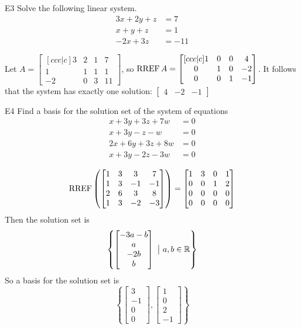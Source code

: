 \documentclass{sbgLAsemi}
\begin{document}
\begin{problem}{E3}
Solve the following linear system.
\begin{align*}
3x+2y+z &= 7 \\
x+y+z &= 1 \\
-2x+3z &= -11
\end{align*}
\end{problem}
\begin{solution}
Let \(A =
  \begin{bmatrix}[ccc|c]
    3 & 2 & 1 & 7 \\
    1 & 1 & 1 & 1 \\
    -2 & 0 & 3 & 11
  \end{bmatrix}
\), so \(\operatorname{RREF} A =
  \begin{bmatrix}[ccc|c]
    1 & 0 & 0 & 4 \\
    0 & 1 & 0 & -2 \\
    0 & 0 & 1 & -1
  \end{bmatrix}
\). It follows that the system has exactly one solution:
\(\begin{bmatrix}
  4 & -2 & -1
\end{bmatrix}\)
\end{solution}
\begin{problem}{E4}
Find a basis for the solution set of the system of equations
\begin{align*}
x+3y+3z+7w &= 0 \\
 x+3y-z-w &= 0 \\
  2x+6y+3z+8w &= 0 \\
   x+3y-2z-3w &= 0
\end{align*}
\end{problem}
\begin{solution}
$$\operatorname{RREF}\left(\begin{bmatrix} 1 & 3 & 3 & 7 \\ 1 & 3 & -1 & -1 \\ 2 & 6 & 3 & 8 \\ 1 & 3 & -2 & -3 \end{bmatrix}\right) = \begin{bmatrix} 1 & 3 & 0 & 1 \\ 0 & 0 & 1 & 2 \\ 0 & 0 & 0 & 0 \\ 0 & 0 & 0 & 0 \end{bmatrix}$$
Then the solution set is
$$\left\{ \begin{bmatrix} -3a-b \\ a \\ -2b \\ b \end{bmatrix}\ \big|\ a,b \in \mathbb{R}\right\}$$
So a basis for the solution set is $$ \left\{ \begin{bmatrix} 3 \\ -1 \\ 0 \\ 0 \end{bmatrix} , \begin{bmatrix} 1\\0 \\ 2 \\ -1 \end{bmatrix} \right\} $$
\end{solution}
\end{document}
